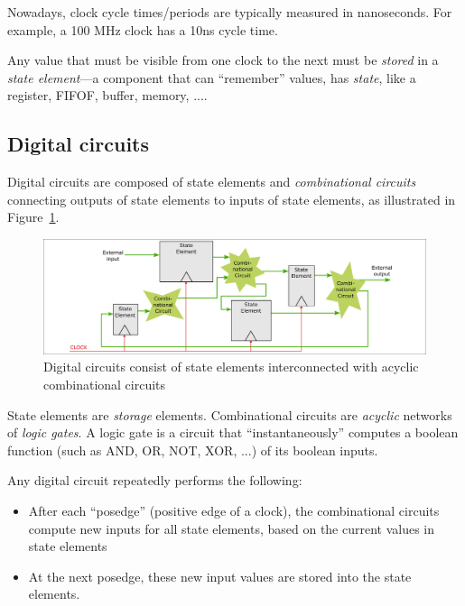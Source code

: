 Nowadays, clock cycle times/periods are typically measured in
nanoseconds. For example, a 100 MHz clock has a 10ns cycle time.


Any value that must be visible from one clock to the next must be
\emph{stored} in a \emph{state element}---a component that can
``remember'' values, {\ie} has \emph{state}, like a register, FIFOF,
buffer, memory, ....


\subsection{Digital circuits}


Digital circuits are composed of state elements and
\emph{combinational circuits} connecting outputs of state elements to
inputs of state elements, as illustrated in
Figure~\ref{Fig_BSV_Digital_Circuits}.
\begin{figure}[htbp]
  \centerline{\includegraphics[width=6in,angle=0]{Figures/Fig_BSV_Digital_Circuits}}
  \caption{\label{Fig_BSV_Digital_Circuits}
           Digital circuits consist of state elements interconnected
	   with acyclic combinational circuits}
\end{figure}

State elements are \emph{storage} elements.  Combinational circuits
are \emph{acyclic} networks of \emph{logic gates}.  A logic gate is a
circuit that ``instantaneously'' computes a boolean function (such as
AND, OR, NOT, XOR, ...) of its boolean inputs.

Any digital circuit repeatedly performs the following:

\begin{itemize}

\item After each ``posedge'' (positive edge of a clock), the
      combinational circuits compute new inputs for all state
      elements, based on the current values in state elements

\item At the next posedge, these new input values are stored into the
      state elements.

\end{itemize}

